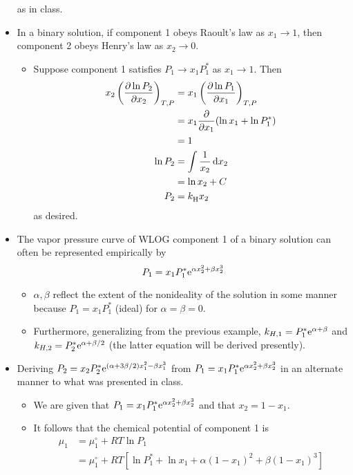 \documentclass[../notes.tex]{subfiles}
\begin{document}
\begin{itemize}
    as in class.
    \item In a binary solution, if component 1 obeys Raoult's law as $x_1\to 1$, then component 2 obeys Henry's law as $x_2\to 0$.
    \begin{itemize}
        \item Suppose component 1 satisfies $P_1\to x_1P_1^*$ as $x_1\to 1$. Then
        \begin{align*}
            x_2\left( \pdv{\ln P_2}{x_2} \right)_{T,P} &= x_1\left( \pdv{\ln P_1}{x_1} \right)_{T,P}\\
            &= x_1\pdv{x_1}(\ln x_1+\ln P_1^*)\\
            &= 1\\
            \ln P_2 &= \int\frac{1}{x_2}\dd{x_2}\\
            &= \ln x_2+C\\
            P_2 &= \kH x_2
        \end{align*}
        as desired.
    \end{itemize}
    \item The vapor pressure curve of WLOG component 1 of a binary solution can often be represented empirically by
    \begin{equation*}
        P_1 = x_1P_1^*\e[\alpha x_2^2+\beta x_2^3]
    \end{equation*}
    \begin{itemize}
        \item $\alpha,\beta$ reflect the extent of the nonideality of the solution in some manner because $P_1=x_1P_1^*$ (ideal) for $\alpha=\beta=0$.
        \item Furthermore, generalizing from the previous example, $k_{H,1}=P_1^*\e[\alpha+\beta]$ and $k_{H,2}=P_2^*\e[\alpha+\beta/2]$ (the latter equation will be derived presently).
    \end{itemize}
    \item Deriving $P_2=x_2P_2^*\e[(\alpha+3\beta/2)x_1^2-\beta x_1^3]$ from $P_1=x_1P_1^*\e[\alpha x_2^2+\beta x_2^3]$ in an alternate manner to what was presented in class.
    \begin{itemize}
        \item We are given that $P_1=x_1P_1^*\e[\alpha x_2^2+\beta x_2^3]$ and that $x_2=1-x_1$.
        \item It follows that the chemical potential of component 1 is
        \begin{align*}
            \mu_1 &= \mu_1^\circ+RT\ln P_1\\
            &= \mu_1^\circ+RT\left[ \ln P_1^*+\ln x_1+\alpha(1-x_1)^2+\beta(1-x_1)^3 \right]

\end{align*}
\end{itemize}
\end{itemize}
\end{document}

